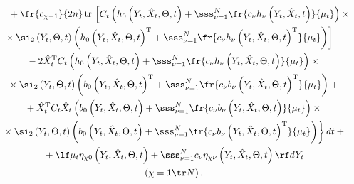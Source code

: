 \begin{multline}

\hspace*{5mm}{}+ \fr{c_{\chi-1}}{2n}\,\mathrm{tr}\, \left[ C_t\left(h_0

    \left(Y_t,\hat X_t,\Theta,t\right)+\sss_{\nu=1}^N \fr{c_\nu h_\nu \left(Y_t,\hat

    X_t,t\right)}{\mu_t}\right)\times{}\right.\\

\left.{}\times  \si_2 \left(Y_t,\Theta,t\right)\left( h_0 \left(Y_t,\hat

    X_t,\Theta,t\right)^{\mathrm{T}}+\sss_{\nu=1}^N \fr{c_\nu h_\nu \left(Y_t,\hat

    X_t,\Theta,t\right)^{\mathrm{T}}}{\mu_t}\right)\right]-{}\\

{}-2 \hat X_t^{\mathrm{T}} C_t \left(h_0 \left(Y_t,\hat X_t,\Theta,t\right)

    + \sss_{\nu=1}^N 

    \fr{c_\nu h_\nu \left(Y_t,\hat X_t,\Theta,t\right)}{\mu_t}\right)\times{}\\

{}\times \si_2 \left(Y_t,\Theta,t\right) \left( b_0 \left(Y_t,\hat X_t,\Theta,

t\right)^{\mathrm{T}} +\sss_{\nu=1}^N  \fr{c_\nu b_\nu 

\left(Y_t,\hat X_t,\Theta,t\right)^{\mathrm{T}} }{\mu_t}\right)+{}\\

{}+\hat X_t^{\mathrm{T}} C_t \hat X_t \left( 

b_0 \left(Y_t,\hat X_t,\Theta,t\right)+\sss_{\nu=1}^N \fr{c_\nu

    b_\nu \left(Y_t,\hat X_t,\Theta,t\right)}{\mu_t}\right)\times{}\\

\left.{}\times \si_2 \left(Y_t,\Theta,t\right) \left( 

b_0 \left(Y_t,\hat X_t,\Theta,t\right) +\sss_{\nu=1}^N \fr{c_\nu

    b_\nu \left(Y_t,\hat X_t,\Theta,t\right)^{\mathrm{T}} }{\mu_t}\right) \right\} dt+{}\\

{}+\lf \mu_t\eta_{\chi 0} \left(Y_t,\hat X_t,\Theta,t\right) + \sss_{\nu=1}^N c_\nu

    \eta_{\chi\nu} \left(Y_t,\hat X_t,\Theta,t\right)\rf dY_t\\

    (\chi =1\tr     N)\,.

    \label{e3.41-s2}

    \end{multline}



